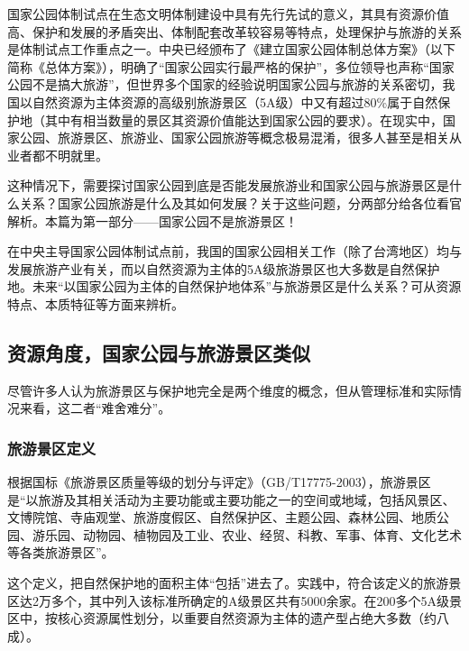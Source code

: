 \documentclass[
]{book}
\begin{document}
国家公园体制试点在生态文明体制建设中具有先行先试的意义，其具有资源价值高、保护和发展的矛盾突出、体制配套改革较容易等特点，处理保护与旅游的关系是体制试点工作重点之一。中央已经颁布了《建立国家公园体制总体方案》（以下简称《总体方案》），明确了``国家公园实行最严格的保护''，多位领导也声称``国家公园不是搞大旅游''，但世界多个国家的经验说明国家公园与旅游的关系密切，我国以自然资源为主体资源的高级别旅游景区（5A级）中又有超过80\%属于自然保护地（其中有相当数量的景区其资源价值能达到国家公园的要求）。在现实中，国家公园、旅游景区、旅游业、国家公园旅游等概念极易混淆，很多人甚至是相关从业者都不明就里。

这种情况下，需要探讨国家公园到底是否能发展旅游业和国家公园与旅游景区是什么关系？国家公园旅游是什么及其如何发展？关于这些问题，分两部分给各位看官解析。本篇为第一部分------国家公园不是旅游景区！

在中央主导国家公园体制试点前，我国的国家公园相关工作（除了台湾地区）均与发展旅游产业有关，而以自然资源为主体的5A级旅游景区也大多数是自然保护地。未来``以国家公园为主体的自然保护地体系''与旅游景区是什么关系？可从资源特点、本质特征等方面来辨析。

\hypertarget{ux8d44ux6e90ux89d2ux5ea6ux56fdux5bb6ux516cux56edux4e0eux65c5ux6e38ux666fux533aux7c7bux4f3c}{%
\subsection{资源角度，国家公园与旅游景区类似}\label{ux8d44ux6e90ux89d2ux5ea6ux56fdux5bb6ux516cux56edux4e0eux65c5ux6e38ux666fux533aux7c7bux4f3c}}

尽管许多人认为旅游景区与保护地完全是两个维度的概念，但从管理标准和实际情况来看，这二者``难舍难分''。

\hypertarget{ux65c5ux6e38ux666fux533aux5b9aux4e49}{%
\subsubsection{旅游景区定义}\label{ux65c5ux6e38ux666fux533aux5b9aux4e49}}

根据国标《旅游景区质量等级的划分与评定》（GB/T17775-2003），旅游景区是``以旅游及其相关活动为主要功能或主要功能之一的空间或地域，包括风景区、文博院馆、寺庙观堂、旅游度假区、自然保护区、主题公园、森林公园、地质公园、游乐园、动物园、植物园及工业、农业、经贸、科教、军事、体育、文化艺术等各类旅游景区''。

这个定义，把自然保护地的面积主体``包括''进去了。实践中，符合该定义的旅游景区达2万多个，其中列入该标准所确定的A级景区共有5000余家。在200多个5A级景区中，按核心资源属性划分，以重要自然资源为主体的遗产型占绝大多数（约八成）。
\end{document}

